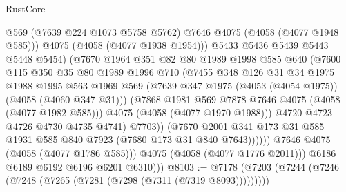 \begin{lexlean}{RustCore}
\begin{coremodule}
                              @569
                              (@7639 @224 @1073 @5758 @5762)
                              @7646
                              @4075
                              (@4058 (@4077 @1948 @585)))
                            @4075
                            (@4058 (@4077 @1938 @1954)))
                          @5433
                          @5436
                          @5439
                          @5443
                          @5448
                          @5454)
                        (@7670
                          @1964
                          @351
                          @82
                          @80
                          @1989
                          @1998
                          @585
                          @640
                          (@7600
                            @115
                            @350
                            @35
                            @80
                            @1989
                            @1996
                            @710
                            (@7455
                              @348
                              @126
                              @31
                              @34
                              @1975
                              @1988
                              @1995
                              @563
                              @1969
                              @569
                              (@7639 @347 @1975 (@4053 (@4054 @1975)) (@4058 (@4060 @347 @31)))
                              (@7868 @1981 @569 @7878 @7646 @4075 (@4058 (@4077 @1982 @585)))
                              @4075
                              (@4058 (@4077 @1970 @1988)))
                            @4720
                            @4723
                            @4726
                            @4730
                            @4735
                            @4741)
                          @7703))
                      (@7670
                        @2001
                        @341
                        @173
                        @31
                        @585
                        @1931
                        @585
                        @840
                        @7923
                        (@7680 @173 @31 @840 @7643))))))
              @7646
              @4075
              (@4058 (@4077 @1786 @585)))
            @4075
            (@4058 (@4077 @1776 @2011)))
          @6186
          @6189
          @6192
          @6196
          @6201
          @6310)))
@8103 := @7178 (@7203 (@7244 (@7246 (@7248 (@7265 (@7281 (@7298 (@7311 (@7319 @8093)))))))))

\end{coremodule}
\end{lexlean}
